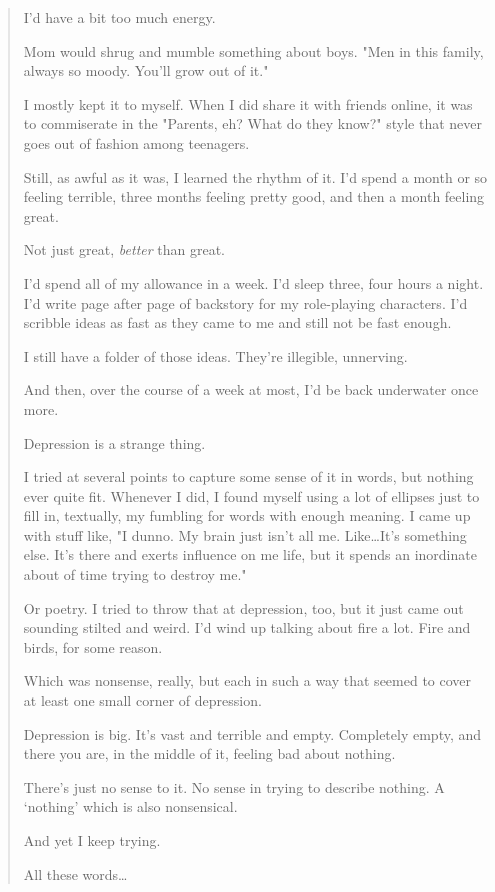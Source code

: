 \begin{paracol}{2}
\begin{leftcolumn}
\begin{quotation}
I'd have a bit too much energy.

Mom would shrug and mumble something about boys. "Men in this family, always so moody. You'll grow out of it."

I mostly kept it to myself. When I did share it with friends online, it was to commiserate in the "Parents, eh? What do they know?" style that never goes out of fashion among teenagers.

Still, as awful as it was, I learned the rhythm of it. I'd spend a month or so feeling terrible, three months feeling pretty good, and then a month feeling great.

Not just great, \emph{better} than great.

I'd spend all of my allowance in a week. I'd sleep three, four hours a night. I'd write page after page of backstory for my role-playing characters. I'd scribble ideas as fast as they came to me and still not be fast enough.

I still have a folder of those ideas. They're illegible, unnerving.

And then, over the course of a week at most, I'd be back underwater once more.

Depression is a strange thing.

I tried at several points to capture some sense of it in words, but nothing ever quite fit. Whenever I did, I found myself using a lot of ellipses just to fill in, textually, my fumbling for words with enough meaning. I came up with stuff like, "I dunno. My brain just isn't all me. Like\ldots{}It's something else. It's there and exerts influence on me life, but it spends an inordinate about of time trying to destroy me."

Or poetry. I tried to throw that at depression, too, but it just came out sounding stilted and weird. I'd wind up talking about fire a lot. Fire and birds, for some reason.

Which was nonsense, really, but each in such a way that seemed to cover at least one small corner of depression.

Depression is big. It's vast and terrible and empty. Completely empty, and there you are, in the middle of it, feeling bad about nothing.

There's just no sense to it. No sense in trying to describe nothing. A ‘nothing' which is also nonsensical.

And yet I keep trying.

All these words\ldots{}
\end{quotation}


\end{leftcolumn}
\end{paracol}
